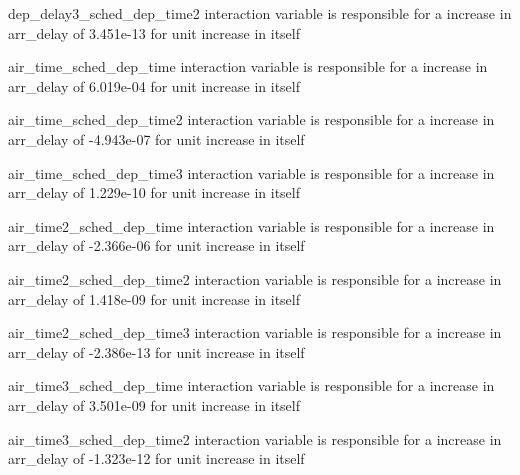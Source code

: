 \documentclass[
]{article}
\begin{document}
dep\_delay3\_sched\_dep\_time2 interaction variable is responsible for a
increase in arr\_delay of 3.451e-13 for unit increase in itself

air\_time\_sched\_dep\_time interaction variable is responsible for a
increase in arr\_delay of 6.019e-04 for unit increase in itself

air\_time\_sched\_dep\_time2 interaction variable is responsible for a
increase in arr\_delay of -4.943e-07 for unit increase in itself

air\_time\_sched\_dep\_time3 interaction variable is responsible for a
increase in arr\_delay of 1.229e-10 for unit increase in itself

air\_time2\_sched\_dep\_time interaction variable is responsible for a
increase in arr\_delay of -2.366e-06 for unit increase in itself

air\_time2\_sched\_dep\_time2 interaction variable is responsible for a
increase in arr\_delay of 1.418e-09 for unit increase in itself

air\_time2\_sched\_dep\_time3 interaction variable is responsible for a
increase in arr\_delay of -2.386e-13 for unit increase in itself

air\_time3\_sched\_dep\_time interaction variable is responsible for a
increase in arr\_delay of 3.501e-09 for unit increase in itself

air\_time3\_sched\_dep\_time2 interaction variable is responsible for a
increase in arr\_delay of -1.323e-12 for unit increase in itself
\end{document}
